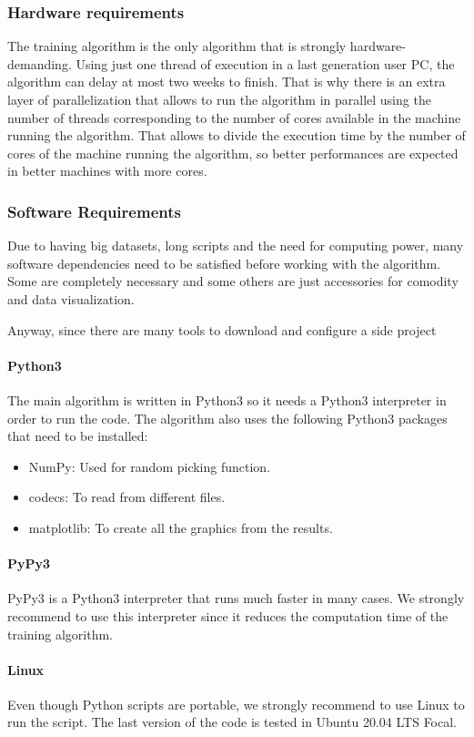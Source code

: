 \documentclass[11pt]{article}
\begin{document}
    \subsubsection{Hardware requirements}
    The training algorithm is the only algorithm that is strongly hardware-demanding. Using just one thread of execution in a last generation user PC, the algorithm can delay at most two weeks to finish. That is why there is an extra layer of parallelization that allows to run the algorithm in parallel using the number of threads corresponding to the number of cores available in the machine running the algorithm. That allows to divide the execution time by the number of cores of the machine running the algorithm, so better performances are expected in better machines with more cores.
    \subsubsection{Software Requirements}
    Due to having big datasets, long scripts and the need for computing power, many software dependencies need to be satisfied before working with the algorithm. Some are completely necessary and some others are just accessories for comodity and data visualization.
    \par 
    Anyway, since there are many tools to download and configure a side project
      \paragraph{Python3}     
      The main algorithm is written in Python3 so it needs a Python3 interpreter in order to run the code. The algorithm also uses the following Python3 packages that need to be installed:
        \begin{itemize}
          \item NumPy: Used for random picking function.
          \item codecs: To read from different files.
          \item matplotlib: To create all the graphics from the results.
        \end{itemize}
      \paragraph{PyPy3}
      PyPy3 is a Python3 interpreter that runs much faster in many cases. We strongly recommend to use this interpreter since it reduces the computation time of the training algorithm.
      \paragraph{Linux}
      Even though Python scripts are portable, we strongly recommend to use Linux to run the script. The last version of the code is tested in Ubuntu 20.04 LTS Focal.
\end{document}
